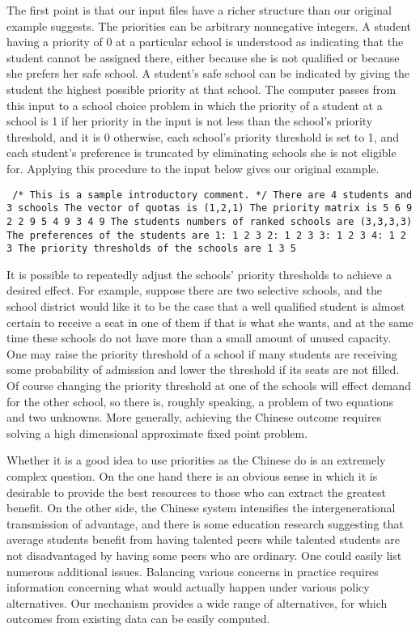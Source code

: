 \documentclass[12pt]{article}
\theoremstyle{definition}
\begin{document}
The first point is that our input files have a richer structure than
our original example suggests.  The priorities can be arbitrary
nonnegative integers.  A student having a priority of 0 at a
particular school is understood as indicating that the student cannot
be assigned there, either because she is not qualified or because she
prefers her safe school.  A student's safe school can be indicated by
giving the student the highest possible priority at that school.  The
computer passes from this input to a school choice problem in which
the priority of a student at a school is 1 if her priority in the
input is not less than the school's priority threshold, and it is 0
otherwise, each school's priority threshold is set to 1, and each
student's preference is truncated by eliminating schools she is not
eligible for.  Applying this procedure to the input below gives our
original example.

\begin{obeylines}\texttt{
/* This is a sample introductory comment. */
There are 4 students and 3 schools
The vector of quotas is (1,2,1)
The priority matrix is
     5     6     9
     2     2     9
     5     4     9
     3     4     9
The students numbers of ranked schools are (3,3,3,3)
The preferences of the students are
1:  1  2  3  
2:  1  2  3  
3:  1  2  3  
4:  1  2  3  
The priority thresholds of the schools are
1   3   5   
  }
\end{obeylines}

It is possible to repeatedly adjust the schools' priority thresholds
to achieve a desired effect.  For example, suppose there are two
selective schools, and the school district would like it to be the
case that a well qualified student is almost certain to receive a seat
in one of them if that is what she wants, and at the same time these
schools do not have more than a small amount of unused capacity.  One
may raise the priority threshold of a school if many students are
receiving some probability of admission and lower the threshold if its
seats are not filled.  Of course changing the priority threshold at
one of the schools will effect demand for the other school, so there
is, roughly speaking, a problem of two equations and two unknowns.
More generally, achieving the Chinese outcome requires solving a high
dimensional approximate fixed point problem.

Whether it is a good idea to use priorities as the Chinese do is an
extremely complex question.  On the one hand there is an obvious sense
in which it is desirable to provide the best resources to those who
can extract the greatest benefit.  On the other side, the Chinese
system intensifies the intergenerational transmission of advantage,
and there is some education research suggesting that average students
benefit from having talented peers while talented students are not
disadvantaged by having some peers who are ordinary. One could easily
list numerous additional issues.  Balancing various concerns in
practice requires information concerning what would actually happen
under various policy alternatives.  Our mechanism provides a wide
range of alternatives, for which outcomes from existing data can be
easily computed.
\end{document}
